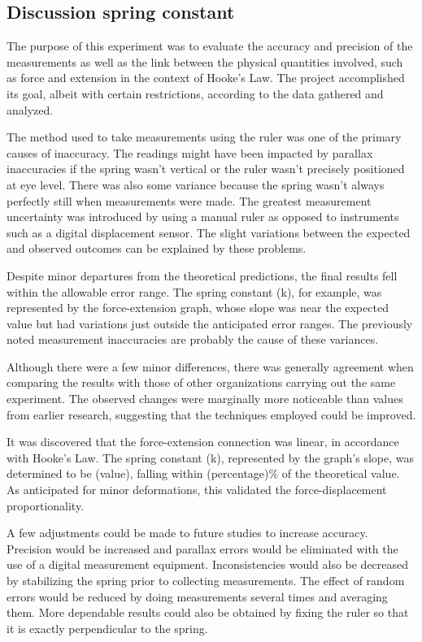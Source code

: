 \documentclass[a4paper, 10pt]{article}
\begin{document}
\begin{justify}
\section{Discussion spring constant}
\justifying
The purpose of this experiment was to evaluate the accuracy and precision of the measurements as well as the link between the physical quantities involved, such as force and extension in the context of Hooke's Law. The project accomplished its goal, albeit with certain restrictions, according to the data gathered and analyzed.
\par
The method used to take measurements using the ruler was one of the primary causes of inaccuracy. The readings might have been impacted by parallax inaccuracies if the spring wasn't vertical or the ruler wasn't precisely positioned at eye level. There was also some variance because the spring wasn't always perfectly still when measurements were made. The greatest measurement uncertainty was introduced by using a manual ruler as opposed to instruments such as a digital displacement sensor. The slight variations between the expected and observed outcomes can be explained by these problems.
\par
Despite minor departures from the theoretical predictions, the final results fell within the allowable error range. The spring constant (k), for example, was represented by the force-extension graph, whose slope was near the expected value but had variations just outside the anticipated error ranges. The previously noted measurement inaccuracies are probably the cause of these variances.
\par
Although there were a few minor differences, there was generally agreement when comparing the results with those of other organizations carrying out the same experiment. The observed changes were marginally more noticeable than values from earlier research, suggesting that the techniques employed could be improved.
\par
It was discovered that the force-extension connection was linear, in accordance
with Hooke's Law. The spring constant (k), represented by the graph's slope, was
determined to be (value), falling within (percentage)\% of the theoretical
value. As anticipated for minor deformations, this validated the
force-displacement proportionality.
\par
A few adjustments could be made to future studies to increase accuracy. Precision would be increased and parallax errors would be eliminated with the use of a digital measurement equipment. Inconsistencies would also be decreased by stabilizing the spring prior to collecting measurements. The effect of random errors would be reduced by doing measurements several times and averaging them. More dependable results could also be obtained by fixing the ruler so that it is exactly perpendicular to the spring.

\end{justify}
\end{document}
